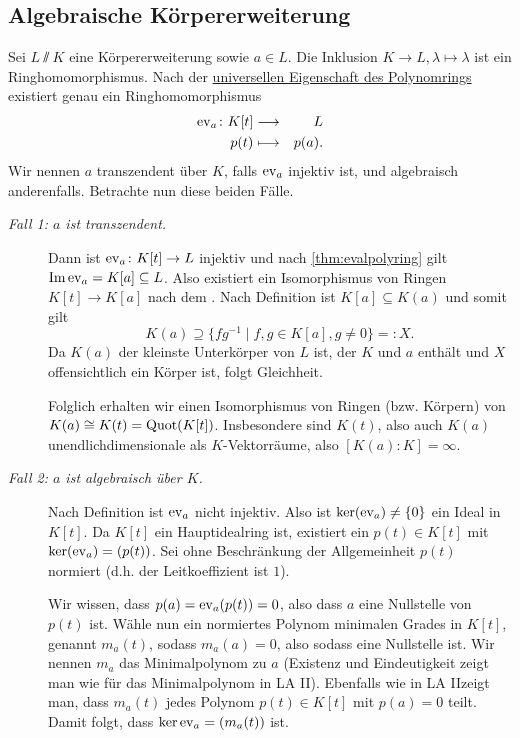 \documentclass[12pt,a4paper]{scrartcl}
\begin{document}
\subsection{Algebraische Körpererweiterung}
Sei $L\sslash K$ eine Körpererweiterung sowie $a\in L$. Die Inklusion $K\to L, \lambda\mapsto\lambda$ ist ein Ringhomomorphismus. Nach der \hyperref[thm:unieig_polyring]{universellen Eigenschaft des Polynomrings} existiert genau ein Ringhomomorphismus
\begin{eqnarray*}
	\operatorname{ev}_a\colon K[t] &\longrightarrow & L\\
	p(t) & \longmapsto & p(a).
\end{eqnarray*}
Wir nennen $a$ transzendent über $K$, falls $\operatorname{ev}_a$ injektiv ist, und algebraisch anderenfalls. Betrachte nun diese beiden Fälle.
\begin{description}
	\item[\emph{Fall 1: $a$ ist transzendent.}] Dann ist $\operatorname{ev}_a\colon  K[t]\to L$ injektiv und nach \cref{thm:evalpolyring} gilt $\operatorname{Im}\operatorname{ev}_a = K[a]\subseteq L$.
	Also existiert ein Isomorphismus von Ringen $K[t]\to K[a]$ nach dem . Nach Definition ist $K[a]\subseteq K(a)$ und somit gilt
	\[K(a) \supseteq \{fg^{-1}\mid f,g\in K[a], g\neq 0\} =: X.\]
	Da $K(a)$ der kleinste Unterkörper von $L$ ist, der $K$ und $a$ enthält und $X$ offensichtlich ein Körper ist, folgt Gleichheit.
	
	Folglich erhalten wir einen Isomorphismus von Ringen (bzw. Körpern) von $K(a)\cong K(t) = \operatorname{Quot}(K[t])$. Insbesondere sind $K(t)$, also auch $K(a)$ unendlichdimensionale als $K$-Vektorräume, also $[K(a):K] = \infty$.
	
	\item[\emph{Fall 2: $a$ ist algebraisch über $K$.}] Nach Definition ist $\operatorname{ev}_a$ nicht injektiv. Also ist $\operatorname{ker}(\operatorname{ev}_a)\neq \{0\}$ ein Ideal in $K[t]$. Da $K[t]$ ein Hauptidealring ist, existiert ein $p(t)\in K[t]$ mit $\operatorname{ker}(\operatorname{ev}_a) = (p(t))$. Sei ohne Beschränkung der Allgemeinheit $p(t)$ normiert (d.h. der Leitkoeffizient ist $1$).
	
	Wir wissen, dass $p(a) = \operatorname{ev}_a(p(t)) = 0$, also dass $a$ eine Nullstelle von $p(t)$ ist. Wähle nun ein normiertes Polynom minimalen Grades in $K[t]$, genannt $m_a(t)$, sodass $m_a(a) = 0$, also sodass eine Nullstelle ist. Wir nennen $m_a$ das Minimalpolynom zu $a$ (Existenz und Eindeutigkeit zeigt man wie für das Minimalpolynom in LA II). Ebenfalls wie in LA IIzeigt man, dass $m_a(t)$ jedes Polynom $p(t)\in K[t]$ mit $p(a)=0$ teilt. Damit folgt, dass $\operatorname{ker}\operatorname{ev}_a = (m_a(t))$ ist.


\end{description}
\end{document}
